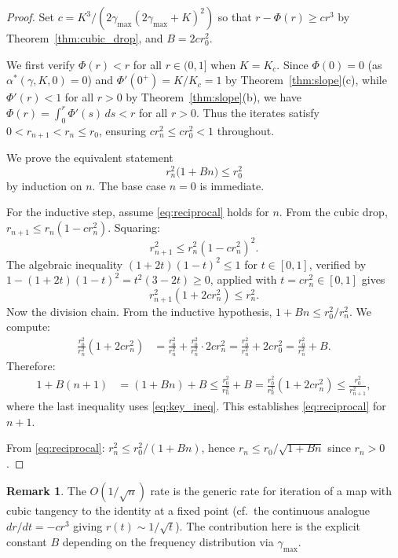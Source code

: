 \documentclass[12pt]{article}
\theoremstyle{definition}
\newtheorem{remark}[theorem]{Remark}
\begin{document}
\begin{proof}
Set $c = K^3/(2\gamma_{\max}(2\gamma_{\max}+K)^2)$ so that
$r - \Phi(r) \ge cr^3$ by Theorem~\ref{thm:cubic_drop}, and $B = 2cr_0^2$.

We first verify $\Phi(r) < r$ for all $r \in (0,1]$ when $K = K_c$.
Since $\Phi(0) = 0$ (as $\alpha^*(\gamma,K,0) = 0$) and $\Phi'(0^+) = K/K_c = 1$
by Theorem~\ref{thm:slope}(c), while $\Phi'(r) < 1$ for all $r > 0$ by
Theorem~\ref{thm:slope}(b), we have
$\Phi(r) = \int_0^r \Phi'(s)\,ds < r$ for all $r > 0$.
Thus the iterates satisfy $0 < r_{n+1} < r_n \le r_0$, ensuring
$cr_n^2 \le cr_0^2 < 1$ throughout.

We prove the equivalent statement
\begin{equation}\label{eq:reciprocal}
r_n^2\bigl(1 + Bn\bigr) \le r_0^2
\end{equation}
by induction on $n$.  The base case $n=0$ is immediate.

For the inductive step, assume \eqref{eq:reciprocal} holds for $n$.
From the cubic drop, $r_{n+1} \le r_n(1 - cr_n^2)$.  Squaring:
\[
r_{n+1}^2 \le r_n^2(1 - cr_n^2)^2.
\]
The algebraic inequality $(1+2t)(1-t)^2 \le 1$ for $t \in [0,1]$,
verified by $1 - (1+2t)(1-t)^2 = t^2(3-2t) \ge 0$,
applied with $t = cr_n^2 \in [0,1]$ gives
\begin{equation}\label{eq:key_ineq}
r_{n+1}^2(1 + 2cr_n^2) \le r_n^2.
\end{equation}
Now the division chain.  From the inductive hypothesis,
$1 + Bn \le r_0^2/r_n^2$.  We compute:
\begin{align*}
\frac{r_0^2}{r_n^2}(1 + 2cr_n^2)
&= \frac{r_0^2}{r_n^2} + \frac{r_0^2}{r_n^2} \cdot 2cr_n^2
= \frac{r_0^2}{r_n^2} + 2cr_0^2
= \frac{r_0^2}{r_n^2} + B.
\end{align*}
Therefore:
\begin{align*}
1 + B(n+1)
&= (1 + Bn) + B
\le \frac{r_0^2}{r_n^2} + B
= \frac{r_0^2}{r_n^2}(1 + 2cr_n^2)
\le \frac{r_0^2}{r_{n+1}^2},
\end{align*}
where the last inequality uses \eqref{eq:key_ineq}.
This establishes \eqref{eq:reciprocal} for $n+1$.

From \eqref{eq:reciprocal}: $r_n^2 \le r_0^2/(1+Bn)$, hence
$r_n \le r_0/\sqrt{1+Bn}$ since $r_n > 0$.
\end{proof}

\begin{remark}
The $O(1/\sqrt{n})$ rate is the generic rate for iteration of a map with
cubic tangency to the identity at a fixed point (cf.\ the continuous analogue
$dr/dt = -cr^3$ giving $r(t) \sim 1/\sqrt{t}$).  The contribution here is
the explicit constant $B$ depending on the frequency distribution via
$\gamma_{\max}$.
\end{remark}
\end{document}
